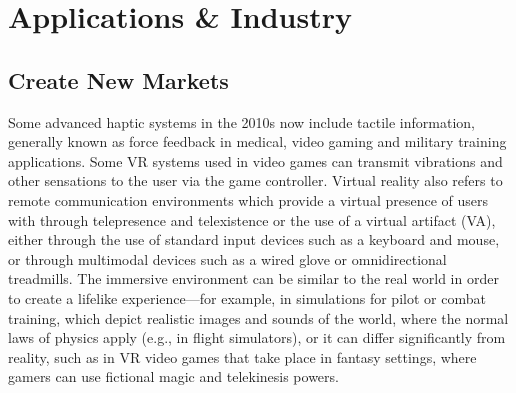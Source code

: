 \documentclass[preprint,12pt]{elsarticle}
\begin{document}



\section{Applications \& Industry} %
\subsection{Create New Markets}
Some advanced haptic systems in the 2010s now include tactile information, generally known as force feedback in medical, video gaming and military training applications. Some VR systems used in video games can transmit vibrations and other sensations to the user via the game controller. Virtual reality also refers to remote communication environments which provide a virtual presence of users with through telepresence and telexistence or the use of a virtual artifact (VA), either through the use of standard input devices such as a keyboard and mouse, or through multimodal devices such as a wired glove or omnidirectional treadmills. The immersive environment can be similar to the real world in order to create a lifelike experience—for example, in simulations for pilot or combat training, which depict realistic images and sounds of the world, where the normal laws of physics apply (e.g., in flight simulators), or it can differ significantly from reality, such as in VR video games that take place in fantasy settings, where gamers can use fictional magic and telekinesis powers.
\end{document}
